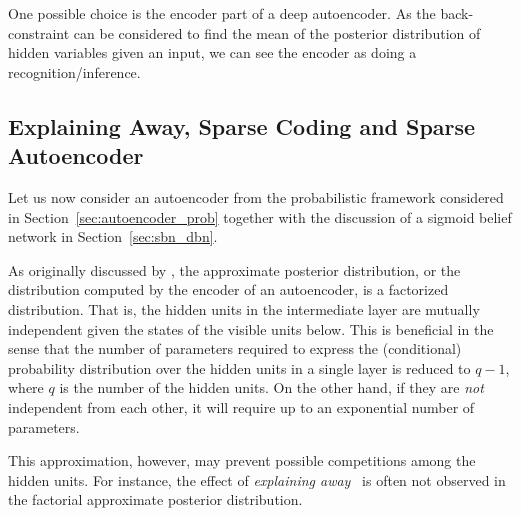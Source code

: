 \documentclass{now}
\begin{document}
One possible choice is the encoder part of a deep autoencoder. As the
back-constraint can be considered to find the mean of the posterior distribution
of hidden variables given an input, we can see the encoder as doing a
recognition/inference.


\subsection{Explaining Away, Sparse Coding and Sparse Autoencoder}
\label{sec:explain_away}

Let us now consider an autoencoder from the probabilistic framework considered
in Section~\ref{sec:autoencoder_prob} together with the discussion of a sigmoid
belief network in Section~\ref{sec:sbn_dbn}. 

As originally discussed by \citet{Hinton1995}, the approximate posterior
distribution, or the distribution computed by the encoder of an autoencoder, is
a factorized distribution. That is, the hidden units in the intermediate layer
are mutually independent given the states of the visible units below. This is
beneficial in the sense that the number of parameters required to express the
(conditional) probability distribution over the hidden units in a single layer
is reduced to $q-1$, where $q$ is the number of the hidden units. On the other
hand, if they are \textit{not} independent from each other, it will require up
to an exponential number of parameters.

This approximation, however, may prevent possible competitions among the hidden
units. For instance, the effect of \textit{explaining away}~\citep[see,
e.g.,][]{Wellman1993} is often not observed in the factorial approximate
posterior distribution. 

\end{document}
